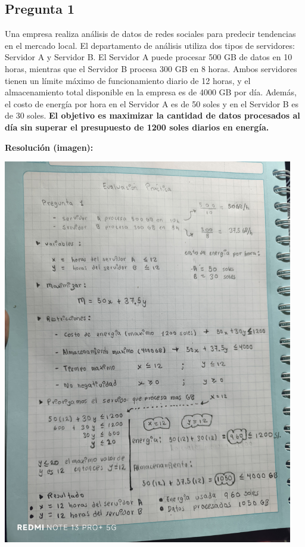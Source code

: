 \documentclass[a4paper,10pt]{article}
\begin{document}
\subsection*{Pregunta 1 }

Una empresa realiza análisis de datos de redes sociales para predecir tendencias en el mercado local.  
El departamento de análisis utiliza dos tipos de servidores: Servidor A y Servidor B.  
El Servidor A puede procesar 500 GB de datos en 10 horas, mientras que el Servidor B procesa 300 GB en 8 horas.  
Ambos servidores tienen un límite máximo de funcionamiento diario de 12 horas, y el almacenamiento total disponible en la empresa es de 4000 GB por día.  
Además, el costo de energía por hora en el Servidor A es de 50 soles y en el Servidor B es de 30 soles.  
\textbf{El objetivo es maximizar la cantidad de datos procesados al día sin superar el presupuesto de 1200 soles diarios en energía.}

\vspace{0.5cm}
\textbf{Resolución (imagen):}
\begin{center}
    \includegraphics[width=0.95\textwidth]{pregunta1.png}
\end{center}
\end{document}

